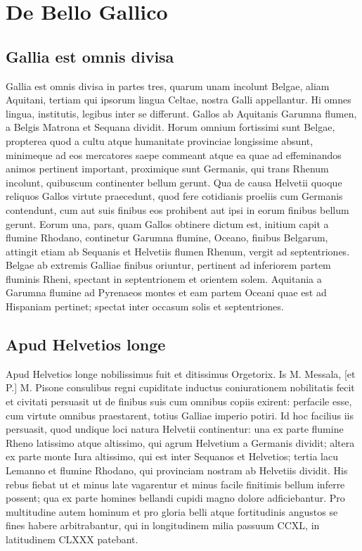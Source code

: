 \section{De Bello Gallico}\raggedbottom 

\subsection{Gallia est omnis divisa} Gallia est omnis divisa in partes tres,
quarum unam
incolunt Belgae, aliam Aquitani, tertiam qui ipsorum lingua
Celtae, nostra Galli appellantur. Hi omnes lingua, institutis,
legibus inter se differunt. Gallos ab Aquitanis Garumna flumen, a
Belgis Matrona et Sequana dividit. Horum omnium fortissimi sunt
Belgae, propterea quod a cultu atque humanitate provinciae
longissime absunt, minimeque ad eos mercatores saepe commeant
atque ea quae ad effeminandos animos pertinent important,
proximique sunt Germanis, qui trans Rhenum incolunt, quibuscum
continenter bellum gerunt. Qua de causa Helvetii quoque reliquos
Gallos virtute praecedunt, quod fere cotidianis proeliis cum
Germanis contendunt, cum aut suis finibus eos prohibent aut ipsi
in eorum finibus bellum gerunt. Eorum una, pars, quam Gallos
obtinere dictum est, initium capit a flumine Rhodano, continetur
Garumna flumine, Oceano, finibus Belgarum, attingit etiam ab
Sequanis et Helvetiis flumen Rhenum, vergit ad septentriones.
Belgae ab extremis Galliae finibus oriuntur, pertinent ad
inferiorem partem fluminis Rheni, spectant in septentrionem et
orientem solem. Aquitania a Garumna flumine ad Pyrenaeos montes et
eam partem Oceani quae est ad Hispaniam pertinet; spectat inter
occasum solis et septentriones.


\subsection{Apud Helvetios longe} Apud Helvetios longe nobilissimus fuit et
ditissimus
Orgetorix. Is M. Messala, [et P.] M. Pisone consulibus regni
cupiditate inductus coniurationem nobilitatis fecit et civitati
persuasit ut de finibus suis cum omnibus copiis exirent: perfacile
esse, cum virtute omnibus praestarent, totius Galliae imperio
potiri. Id hoc facilius iis persuasit, quod undique loci natura
Helvetii continentur: una ex parte flumine Rheno latissimo atque
altissimo, qui agrum Helvetium a Germanis dividit; altera ex parte
monte Iura altissimo, qui est inter Sequanos et Helvetios; tertia
lacu Lemanno et flumine Rhodano, qui provinciam nostram ab
Helvetiis dividit. His rebus fiebat ut et minus late vagarentur et
minus facile finitimis bellum inferre possent; qua ex parte
homines bellandi cupidi magno dolore adficiebantur. Pro
multitudine autem hominum et pro gloria belli atque fortitudinis
angustos se fines habere arbitrabantur, qui in longitudinem milia
passuum CCXL, in latitudinem CLXXX patebant.

